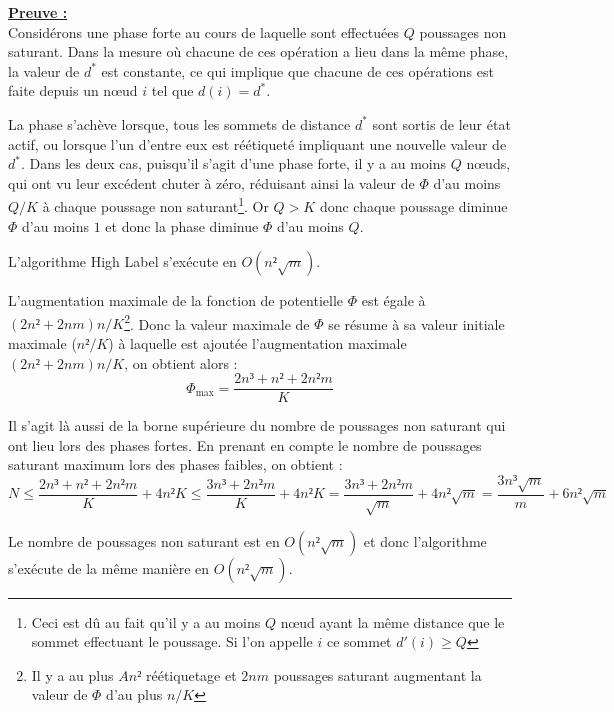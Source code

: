 \underline{\textbf{Preuve :}}\\
Considérons une phase forte au cours de laquelle sont effectuées $Q$ poussages non saturant.
Dans la mesure où chacune de ces opération a lieu dans la même phase, la valeur de $d^*$ est
constante, ce qui implique que chacune de ces opérations est faite depuis un n\oe ud $i$ tel que
$d(i) = d^*$.

La phase s'achève lorsque, tous les sommets de distance $d^*$ sont sortis de leur état actif, ou
lorsque l'un d'entre eux est réétiqueté impliquant une nouvelle valeur de $d^*$. Dans les deux cas,
puisqu'il s'agit d'une phase forte, il y a au moins $Q$ n\oe uds, qui ont vu leur excédent chuter à
zéro, réduisant ainsi la valeur de $\Phi$ d'au moins $Q/K$ à chaque poussage non
saturant\footnote{Ceci est dû au fait qu'il y a au moins $Q$ n\oe ud ayant la même distance que le
sommet effectuant le poussage. Si l'on appelle $i$ ce sommet $d'(i) \geq Q$}. Or $Q>K$
donc chaque poussage diminue $\Phi$ d'au moins $1$ et donc la phase diminue $\Phi$ d'au moins $Q$.

\begin{thrm}
	L'algorithme High Label s'exécute en $O(n²\sqrt{m})$.
\end{thrm}

L'augmentation maximale de la fonction de potentielle $\Phi$ est égale à $(2n²+2nm)n/K$\footnote{Il
	y a au plus $An²$ réétiquetage et $2nm$ poussages saturant augmentant la valeur de $\Phi$ d'au
plus $n/K$}. Donc la valeur maximale de $\Phi$ se résume à sa valeur initiale maximale ($n²/K$) à
laquelle est ajoutée l'augmentation maximale $(2n²+2nm)n/K$, on obtient alors : $$
\Phi_{\max} = \frac{2n³ + n² + 2n²m}{K} $$

Il s'agit là aussi de la borne supérieure du nombre de poussages non saturant qui ont lieu lors des
phases fortes. En prenant en compte le nombre de poussages saturant maximum lors des phases faibles,
on obtient : $$
N \leq \frac{2n³ + n² + 2n²m}{K} + 4n²K \leq \frac{3n³ + 2n²m}{K} + 4n²K = \frac{3n³ +
2n²m}{\sqrt{m}} + 4n²\sqrt{m} = \frac{3n³\sqrt{m}}{m} + 6n²\sqrt{m} $$

Le nombre de poussages non saturant est en $O(n²\sqrt{m})$ et donc l'algorithme s'exécute de la même
manière en $O(n²\sqrt{m})$.

